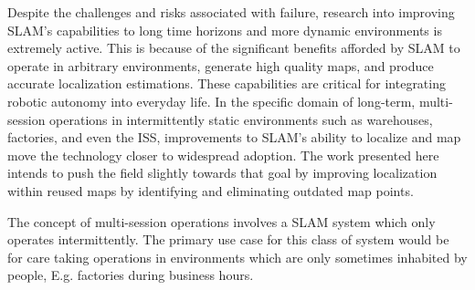 Despite the challenges and risks associated with failure, research into improving SLAM's capabilities to long time horizons and more dynamic environments is extremely active. This is because of the significant benefits afforded by SLAM to operate in arbitrary environments, generate high quality maps, and produce accurate localization estimations. These capabilities are critical for integrating robotic autonomy into everyday life. In the specific domain of long-term, multi-session operations in intermittently static environments such as warehouses, factories, and even the ISS, improvements to SLAM's ability to localize and map move the technology closer to widespread adoption.  The work presented here intends to push the field slightly towards that goal by improving localization within reused maps by identifying and eliminating outdated map points.


The concept of multi-session operations involves a SLAM system which only operates intermittently. The primary use case for this class of system would be for care taking operations in environments which are only sometimes inhabited by people, E.g. factories during business hours.


